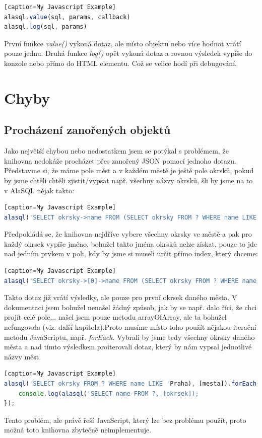 \documentclass[a4, titlepage]{article}
\begin{document}
\begin{lstlisting}[language=JavaScript][caption=My Javascript Example]
alasql.value(sql, params, callback)
alasql.log(sql, params)
\end{lstlisting}

První funkce \textit{value()} vykoná dotaz, ale místo objektu nebo více hodnot vrátí pouze jednu. Druhá funkce \textit{log()} opět vykoná dotaz a rovnou výsledek vypíše do konzole nebo přímo do HTML elementu. Což se velice hodí při debugování.


\section{Chyby}
\subsection{Procházení zanořených objektů}
Jako největší chybou nebo nedostatkem jsem se potýkal s problémem, že knihovna nedokáže procházet přes zanořený JSON pomocí jednoho dotazu. Představme si, že máme pole měst a v každém městě je ještě pole okrsků, pokud by jsme chtěli chtěli zjistit/vypsat např. všechny názvy okrsků, šli by jsme na to v AlaSQL nějak takto:
\begin{lstlisting}[language=JavaScript][caption=My Javascript Example]
alasql('SELECT okrsky->name FROM (SELECT okrsky FROM ? WHERE name LIKE 'Praha'), [mesta]);
\end{lstlisting}
Předpokládá se, že knihovna nejdříve vybere všechny okrsky ve městě a pak pro každý okrsek vypíše jméno, bohužel takto jména okrsků nelze získat, pouze to jde nad jedním prvkem v poli, kdy by jsme si museli určit přímo index, který chceme:
\begin{lstlisting}[language=JavaScript][caption=My Javascript Example]
alasql('SELECT okrsky->[0]->name FROM (SELECT okrsky FROM ? WHERE name LIKE 'Praha'), [mesta]);
\end{lstlisting}
Takto dotaz již vrátí výsledky, ale pouze pro první okrsek daného města. V dokumentaci jsem bohužel nenašel žádný způsob, jak by se např. dalo říci, že chci projít celé pole... našel jsem pouze metodu arrayOfArray, ale ta bohužel nefungovala (viz. další kapitola).Proto musíme místo toho použít nějakou iterační metodu JavaScriptu, např. \textit{forEach}. Vybrali by jsme tedy všechny okrsky daného města a nad tímto výsledkem proiterovali dotaz, který by nám vypsal jednotlivé názvy měst.
\begin{lstlisting}[language=JavaScript][caption=My Javascript Example]
alasql('SELECT okrsky FROM ? WHERE name LIKE 'Praha), [mesta]).forEach(okrsek => {
	console.log(alasql('SELECT name FROM ?, [okrsek]);
});
\end{lstlisting}
Tento problém, ale právě řeší JavaScript, který lze bez problému použít, proto možná toto knihovna zbytečně neimplementuje. 
\end{document}
